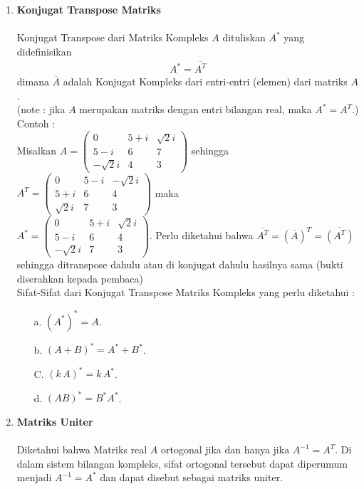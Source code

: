 \documentclass[11pt,a4paper]{article}
\begin{document}
\begin{enumerate}
	\item \textbf{Konjugat Transpose Matriks}\\
	\\
	\hspace*{0.5cm} Konjugat Transpose dari Matriks Kompleks $A$ dituliskan $A^*$ yang didefinisikan
	\begin{align*}
	\displaystyle A^*=\overline{A^{T}}
	\end{align*}
	dimana $\overline{A}$ adalah Konjugat Kompleks dari entri-entri (elemen) dari matriks $A$.\\
	(note : jika $A$ merupakan matriks dengan entri bilangan real, maka $A^*=A^{T}$.)
	Contoh :\\
	Misalkan $A=\begin{pmatrix}
	0 & 5+i & \sqrt{2}i\\ 
	5-i & 6 & 7\\ 
	-\sqrt{2}i & 4 & 3
	\end{pmatrix}$ sehingga $A^{T}=\begin{pmatrix}
	0 & 5-i & -\sqrt{2}i\\ 
	5+i & 6 & 4\\ 
	\sqrt{2}i & 7 & 3
	\end{pmatrix}$ maka\\
	$A^*=\begin{pmatrix}
	0 & 5+i & \sqrt{2}i\\ 
	5-i & 6 & 4\\ 
	-\sqrt{2}i & 7 & 3
	\end{pmatrix}$. 
	Perlu diketahui bahwa $\overline{A^{T}}=\left(\overline{A}\right)^{T}=\overline{\left(A^{T}\right)}$ sehingga ditranspose dahulu atau di konjugat dahulu hasilnya sama (bukti diserahkan kepada pembaca)\\
	
	Sifat-Sifat dari Konjugat Transpose Matriks Kompleks yang perlu diketahui :
	\begin{enumerate}
		\item[a.] $\left(A^*\right)^*=A$.
		\item[b.] $\left(A+B\right)^*=A^*+B^*$.
		\item[C.] $\left(k\, A\right)^*=k\, A^*$.
		\item[d.] $\left(AB\right)^*=B^*A^*$.
	\end{enumerate}
	
	
	\item \textbf{Matriks Uniter}\\
	\\
	\hspace*{0.5cm} Diketahui bahwa Matriks real $A$ ortogonal jika dan hanya jika $A^{-1}=A^{T}$. Di dalam sistem bilangan kompleks, sifat ortogonal tersebut dapat diperumum menjadi $A^{-1}=A^*$ dan dapat disebut sebagai matriks uniter.
	

\end{enumerate}
\end{document}

